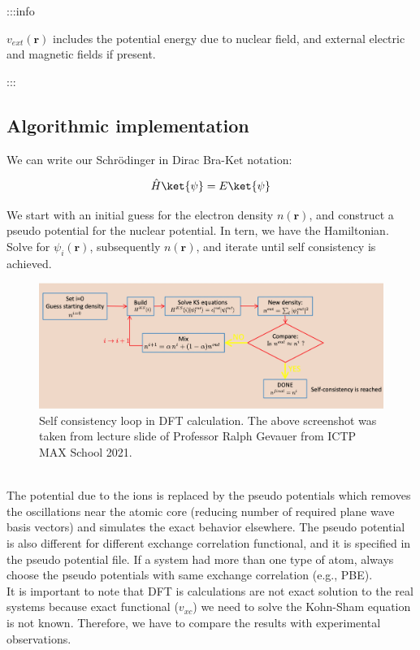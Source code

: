 \documentclass{article}
\begin{document}
:::info

$v_{ext}(\textbf{r})$ includes the potential energy due to nuclear field, and
external electric and magnetic fields if present.

:::\\


\subsection{Algorithmic implementation}
We can write our Schrödinger in Dirac Bra-Ket notation:

$$
\hat{H} \ket{\psi} = E\ket{\psi}
$$

We start with an initial guess for the electron density $n(\textbf{r})$, and
construct a pseudo potential for the nuclear potential. In tern, we have the
Hamiltonian. Solve for $\psi_i(\textbf{r})$, subsequently $n(\textbf{r})$, and
iterate until self consistency is achieved.\\

\begin{figure}[h!]
\centering
\includegraphics[scale=0.4]{SCF.jpg}
\caption{Self consistency loop in DFT calculation. The above screenshot was taken from lecture slide of Professor Ralph Gevauer from  ICTP MAX School 2021.}
\label{fig:univerise}
\end{figure}

\\
The potential due to the ions is replaced by the pseudo potentials which removes
the oscillations near the atomic core (reducing number of required plane wave
basis vectors) and simulates the exact behavior elsewhere. The pseudo potential
is also different for different exchange correlation functional, and it is
specified in the pseudo potential file. If a system had more than one type of
atom, always choose the pseudo potentials with same exchange correlation (e.g.,
PBE).\\

It is important to note that DFT is calculations are not exact solution to the
real systems because exact functional ($v_{xc}$) we need to solve the Kohn-Sham
equation is not known. Therefore, we have to compare the results with
experimental observations.
\end{document}

